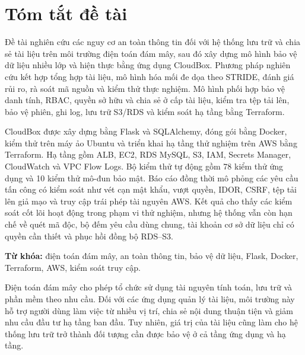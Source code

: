 \clearpage

\renewcommand{\listfigurename}{DANH MỤC HÌNH VẼ, ĐỒ THỊ}

{}

\listoffigures

\clearpage


\pagestyle{baocao}
\section*{Tóm tắt đề tài}
Đề tài nghiên cứu các nguy cơ an toàn thông tin đối với hệ thống lưu trữ và chia sẻ tài liệu trên môi trường điện toán đám mây, sau đó xây dựng mô hình bảo vệ dữ liệu nhiều lớp và hiện thực bằng ứng dụng CloudBox. Phương pháp nghiên cứu kết hợp tổng hợp tài liệu, mô hình hóa mối đe dọa theo STRIDE, đánh giá rủi ro, rà soát mã nguồn và kiểm thử thực nghiệm. Mô hình phối hợp bảo vệ danh tính, RBAC, quyền sở hữu và chia sẻ ở cấp tài liệu, kiểm tra tệp tải lên, bảo vệ phiên, ghi log, lưu trữ S3/RDS và kiểm soát hạ tầng bằng Terraform.

CloudBox được xây dựng bằng Flask và SQLAlchemy, đóng gói bằng Docker, kiểm thử trên máy ảo Ubuntu và triển khai hạ tầng thử nghiệm trên AWS bằng Terraform. Hạ tầng gồm ALB, EC2, RDS MySQL, S3, IAM, Secrets Manager, CloudWatch và VPC Flow Logs. Bộ kiểm thử tự động gồm 78 kiểm thử ứng dụng và 10 kiểm thử mô-đun bảo mật. Báo cáo đồng thời mô phỏng các yêu cầu tấn công có kiểm soát như vét cạn mật khẩu, vượt quyền, IDOR, CSRF, tệp tải lên giả mạo và truy cập trái phép tài nguyên AWS. Kết quả cho thấy các kiểm soát cốt lõi hoạt động trong phạm vi thử nghiệm, nhưng hệ thống vẫn còn hạn chế về quét mã độc, bộ đếm yêu cầu dùng chung, tài khoản cơ sở dữ liệu chỉ có quyền cần thiết và phục hồi đồng bộ RDS--S3.

\noindent\textbf{Từ khóa:} điện toán đám mây, an toàn thông tin, bảo vệ dữ liệu, Flask, Docker, Terraform, AWS, kiểm soát truy cập.


Điện toán đám mây cho phép tổ chức sử dụng tài nguyên tính toán, lưu trữ và phần mềm theo nhu cầu. Đối với các ứng dụng quản lý tài liệu, môi trường này hỗ trợ người dùng làm việc từ nhiều vị trí, chia sẻ nội dung thuận tiện và giảm nhu cầu đầu tư hạ tầng ban đầu. Tuy nhiên, giá trị của tài liệu cũng làm cho hệ thống lưu trữ trở thành đối tượng cần được bảo vệ ở cả tầng ứng dụng và hạ tầng.

